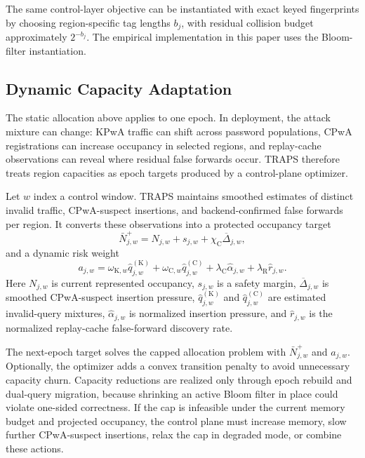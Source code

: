 The same control-layer objective can be instantiated with exact keyed fingerprints by choosing region-specific tag lengths \(b_j\), with residual collision budget approximately \(2^{-b_j}\). The empirical implementation in this paper uses the Bloom-filter instantiation.

\subsection{Dynamic Capacity Adaptation}
\label{sec:dynamic-capacity}

The static allocation above applies to one epoch. In deployment, the attack mixture can change: KPwA traffic can shift across password populations, CPwA registrations can increase occupancy in selected regions, and replay-cache observations can reveal where residual false forwards occur. TRAPS therefore treats region capacities as epoch targets produced by a control-plane optimizer.

Let \(w\) index a control window. TRAPS maintains smoothed estimates of distinct invalid traffic, CPwA-suspect insertions, and backend-confirmed false forwards per region. It converts these observations into a protected occupancy target
\[
\bar N_{j,w}^{+}
=
N_{j,w}
+
s_{j,w}
+
\chi_{\mathrm C}\overline\Delta_{j,w},
\]
and a dynamic risk weight
\[
a_{j,w}
=
\omega_{\mathrm K,w}\widehat q_{j,w}^{(\mathrm K)}
+
\omega_{\mathrm C,w}\widehat q_{j,w}^{(\mathrm C)}
+
\lambda_{\mathrm C}\widehat\alpha_{j,w}
+
\lambda_{\mathrm R}\widehat r_{j,w}.
\]
Here \(N_{j,w}\) is current represented occupancy, \(s_{j,w}\) is a safety margin, \(\overline\Delta_{j,w}\) is smoothed CPwA-suspect insertion pressure, \(\widehat q_{j,w}^{(\mathrm K)}\) and \(\widehat q_{j,w}^{(\mathrm C)}\) are estimated invalid-query mixtures, \(\widehat\alpha_{j,w}\) is normalized insertion pressure, and \(\widehat r_{j,w}\) is the normalized replay-cache false-forward discovery rate.

The next-epoch target solves the capped allocation problem with \(\bar N_{j,w}^{+}\) and \(a_{j,w}\). Optionally, the optimizer adds a convex transition penalty to avoid unnecessary capacity churn. Capacity reductions are realized only through epoch rebuild and dual-query migration, because shrinking an active Bloom filter in place could violate one-sided correctness. If the cap is infeasible under the current memory budget and projected occupancy, the control plane must increase memory, slow further CPwA-suspect insertions, relax the cap in degraded mode, or combine these actions.

